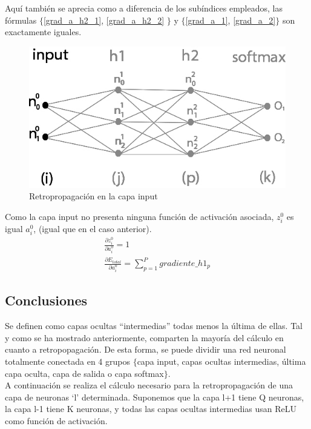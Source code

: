 Aquí también se aprecia como a diferencia de los subíndices empleados, las fórmulas $\{$\ref{grad_a_h2_1}, \ref{grad_a_h2_2} $\}$    y    $\{$\ref{grad_a_1}, \ref{grad_a_2}$\}$ son exactamente iguales.

\begin{figure}[H]
	\centering
	\includegraphics[scale=0.35]{imagenes/nn_2_capa_input.jpg}  
	\caption{Retropropagación en la capa input}
	\label{fig:nn_2_capa_input}
\end{figure}

Como la capa input no presenta ninguna función de activación asociada, $z^0_i$ es igual $a^0_i$, (igual que en el caso anterior). \\

\begin{gather}
	\frac{\partial z^0_i }{\partial a^0_i } = 1 \\
	\frac{\partial E_{total}}{\partial a^0_i} = \sum_{p=1}^{P} gradiente\_h1_p
\end{gather}

\subsection{Conclusiones}
Se definen como capas ocultas ``intermedias'' todas menos la última de ellas. Tal y como se ha mostrado anteriormente, comparten la mayoría del cálculo en cuanto a retropopagación. De esta forma, se puede dividir una red neuronal totalmente conectada en 4 grupos $\{$capa input, capas ocultas intermedias, última capa oculta, capa de salida o capa softmax$\}$. \\
A continuación se realiza el cálculo necesario para la retropropagación de una capa de neuronas `l' determinada. Suponemos que la capa l+1 tiene Q neuronas, la capa l-1 tiene K neuronas, y todas las capas ocultas intermedias usan ReLU como función de activación. \\


